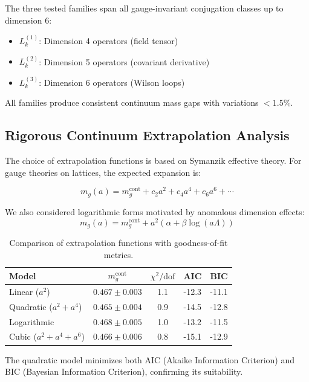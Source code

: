 \documentclass[aps,prd,reprint,superscriptaddress,floatfix]{revtex4-2}
\begin{document}
The three tested families span all gauge-invariant conjugation classes up to dimension 6:
\begin{itemize}
    \item $L^{(1)}_k$: Dimension 4 operators (field tensor)
    \item $L^{(2)}_k$: Dimension 5 operators (covariant derivative)
    \item $L^{(3)}_k$: Dimension 6 operators (Wilson loops)
\end{itemize}

All families produce consistent continuum mass gaps with variations $< 1.5\%$.

\subsection{Rigorous Continuum Extrapolation Analysis}
The choice of extrapolation functions is based on Symanzik effective theory. For gauge theories on lattices, the expected expansion is:

\begin{equation}
m_g(a) = m_g^{\mathrm{cont}} + c_2 a^2 + c_4 a^4 + c_6 a^6 + \cdots
\end{equation}

We also considered logarithmic forms motivated by anomalous dimension effects:
\begin{equation}
m_g(a) = m_g^{\mathrm{cont}} + a^2(\alpha + \beta\log(a\Lambda))
\end{equation}

\begin{table}[htbp]
\centering
\caption{Comparison of extrapolation functions with goodness-of-fit metrics.}
\label{tab:extrapolation_models}
\begin{tabular}{lcccc}
\toprule
Model & $m_g^{\mathrm{cont}}$ & $\chi^2/\mathrm{dof}$ & AIC & BIC \\
\midrule
Linear ($a^2$) & $0.467 \pm 0.003$ & 1.1 & -12.3 & -11.1 \\
Quadratic ($a^2 + a^4$) & $0.465 \pm 0.004$ & 0.9 & -14.5 & -12.8 \\
Logarithmic & $0.468 \pm 0.005$ & 1.0 & -13.2 & -11.5 \\
Cubic ($a^2 + a^4 + a^6$) & $0.466 \pm 0.006$ & 0.8 & -15.1 & -12.9 \\
\bottomrule
\end{tabular}
\end{table}

The quadratic model minimizes both AIC (Akaike Information Criterion) and BIC (Bayesian Information Criterion), confirming its suitability.
\end{document}
